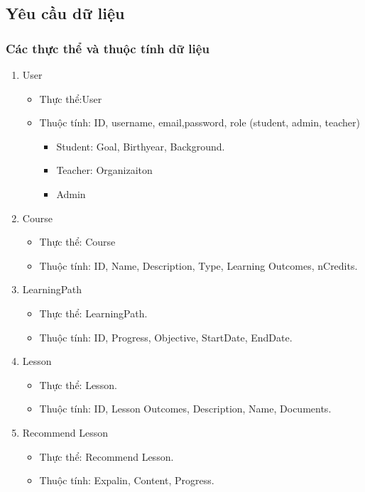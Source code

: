 \subsection{Yêu cầu dữ liệu}
\subsubsection{Các thực thể và thuộc tính dữ liệu}
\begin{enumerate}
    \item User
    \begin{itemize}
        \item Thực thể:User
        \item Thuộc tính: ID, username, email,password, role (student, admin, teacher)
        \begin{itemize}
            \item Student: Goal, Birthyear, Background.
            \item Teacher: Organizaiton
            \item Admin
        \end{itemize}
    \end{itemize}
    \item Course
    \begin{itemize}
        \item Thực thể: Course
        \item Thuộc tính: ID, Name, Description, Type, Learning Outcomes, nCredits.
    \end{itemize}
    \item LearningPath
    \begin{itemize}
        \item Thực thể: LearningPath.
        \item Thuộc tính: ID, Progress, Objective, StartDate, EndDate.
    \end{itemize}
    \item Lesson
    \begin{itemize}
        \item Thực thể: Lesson.
        \item Thuộc tính: ID, Lesson Outcomes, Description, Name, Documents.
    \end{itemize}
    \item Recommend Lesson
    \begin{itemize}
        \item Thực thể: Recommend Lesson.
        \item Thuộc tính: Expalin, Content, Progress.
    \end{itemize}

\end{enumerate}
